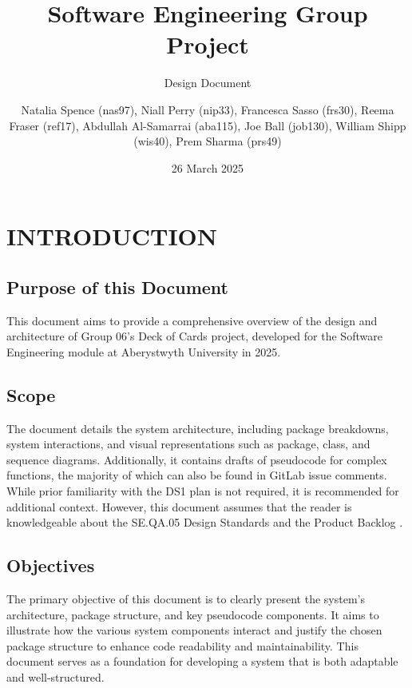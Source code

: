 \documentclass[a4paper]{project}
\title{Software Engineering Group Project}
\subtitle{Design Document}
\date{26 March 2025}
\author{
	Natalia Spence (nas97),
	Niall Perry (nip33),
	Francesca Sasso (frs30),
	Reema Fraser (ref17),
	Abdullah Al-Samarrai (aba115),
	Joe Ball (job130),
	William Shipp (wis40),
	Prem Sharma (prs49)
}
\begin{document}
	\maketitle
	\tableofcontents
	
	\newpage
	
	\section{INTRODUCTION}\label{sec:introduction}
	
		\subsection{Purpose of this Document}\label{subsec:purpose}
		
			This document aims to provide a comprehensive overview of the design and architecture of Group 06's Deck of Cards project, developed for the Software Engineering module at Aberystwyth University in 2025.
		
		\subsection{Scope}\label{subsec:scope}
		
			The document details the system architecture, including package breakdowns, system interactions, and visual representations such as package, class, and sequence diagrams. Additionally, it contains drafts of pseudocode for complex functions, the majority of which can also be found in GitLab issue comments. While prior familiarity with the DS1 plan \cite{DS1} is not required, it is recommended for additional context. However, this document assumes that the reader is knowledgeable about the SE.QA.05 \cite{SE.QA.05} Design Standards and the Product Backlog \cite{Product Backlog}.
		
		\subsection{Objectives}\label{subsec:objectives}
		
			The primary objective of this document is to clearly present the system’s architecture, package structure, and key pseudocode components. It aims to illustrate how the various system components interact and justify the chosen package structure to enhance code readability and maintainability. This document serves as a foundation for developing a system that is both adaptable and well-structured.
		
\end{document}
